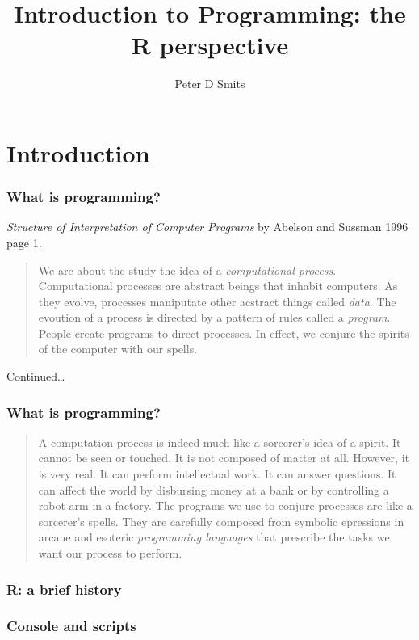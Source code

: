 \documentclass{beamer}\usepackage{graphicx, color}
\title{Introduction to Programming: the R perspective}
\author{Peter D Smits}
\begin{document}
\begin{frame}
  \maketitle
\end{frame}

\section{Introduction}
\begin{frame}
  \frametitle{What is programming?}
  \textit{Structure of Interpretation of Computer Programs} by Abelson and Sussman 1996 page 1.

  \begin{quotation}
    We are about the study the idea of a \textit{computational process}. Computational processes are abstract beings that inhabit computers. As they evolve, processes maniputate other acstract things called \textit{data}. The evoution of a process is directed by a pattern of rules called a \textit{program}. People create programs to direct processes. In effect, we conjure the spirits of the computer with our spells.
  \end{quotation}

  Continued\ldots
\end{frame}

\begin{frame}
  \frametitle{What is programming?}
  \begin{quotation}
    A computation process is indeed much like a sorcerer's idea of a spirit. It cannot be seen or touched. It is not composed of matter at all. However, it is very real. It can perform intellectual work. It can answer questions. It can affect the world by disbursing money at a bank or by controlling a robot arm in a factory. The programs we use to conjure processes are like a sorcerer's spells. They are carefully composed from symbolic epressions in arcane and esoteric \textit{programming languages} that prescribe the tasks we want our process to perform.
  \end{quotation}
\end{frame}

\begin{frame}
  \frametitle{R: a brief history}
\end{frame}

\begin{frame}
  \frametitle{Console and scripts}
\end{frame}
\end{document}
